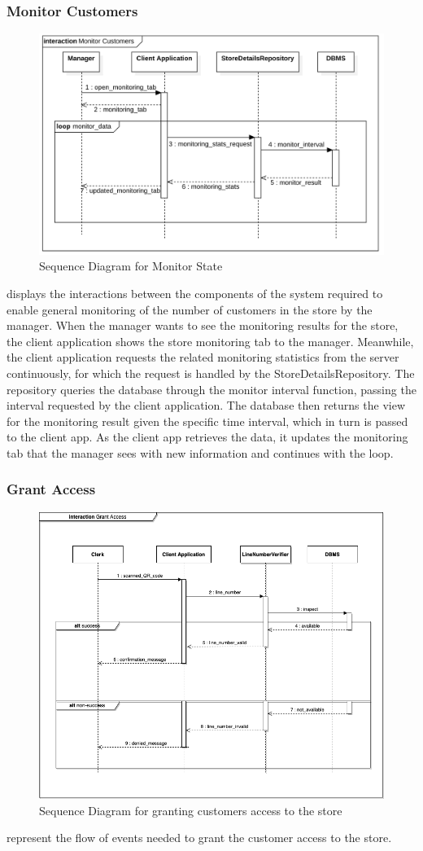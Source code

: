 \subsubsection{Monitor Customers}
\begin{figure}[H]
    \centering
    \includegraphics[height=0.4\textwidth]{Images/SequenceDiagrams/MonitorState.png}
    \caption{Sequence Diagram for Monitor State}
    \label{fig:SDMonitorState}
\end{figure}
 displays the interactions between the components of the system required to enable general monitoring of the number of customers in the store by the manager.
When the manager wants to see the monitoring results for the store, the client application shows the store monitoring tab to the manager.
Meanwhile, the client application requests the related monitoring statistics from the server continuously, for which the request is handled by the StoreDetailsRepository.
The repository queries the database through the monitor interval function, passing the interval requested by the client application.
The database then returns the view for the monitoring result given the specific time interval, which in turn is passed to the client app.
As the client app retrieves the data, it updates the monitoring tab that the manager sees with new information and continues with the loop.

\subsubsection{Grant Access}
\begin{figure}[H]
    \centering
    \includegraphics[height=0.4\textwidth]{Images/SequenceDiagrams/GrantAccess.png}
    \caption{Sequence Diagram for granting customers access to the store}
    \label{fig:SDGrantAccess}
\end{figure} represent the flow of events needed to grant the customer access to the store.

